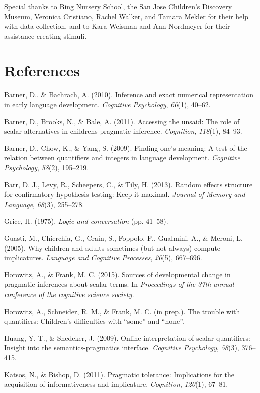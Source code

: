 \documentclass[10pt, letterpaper]{article}
\begin{document}
Special thanks to Bing Nursery School, the San Jose Children's Discovery
Museum, Veronica Cristiano, Rachel Walker, and Tamara Mekler for their
help with data collection, and to Kara Weisman and Ann Nordmeyer for
their assistance creating stimuli.

\section{References}\label{references}

\setlength{\parindent}{-0.1in} \setlength{\leftskip}{0.125in} \noindent

Barner, D., \& Bachrach, A. (2010). Inference and exact numerical
representation in early language development. \emph{Cognitive
Psychology}, \emph{60}(1), 40--62.

Barner, D., Brooks, N., \& Bale, A. (2011). Accessing the unsaid: The
role of scalar alternatives in childrens pragmatic inference.
\emph{Cognition}, \emph{118}(1), 84--93.

Barner, D., Chow, K., \& Yang, S. (2009). Finding one's meaning: A test
of the relation between quantifiers and integers in language
development. \emph{Cognitive Psychology}, \emph{58}(2), 195--219.

Barr, D. J., Levy, R., Scheepers, C., \& Tily, H. (2013). Random effects
structure for confirmatory hypothesis testing: Keep it maximal.
\emph{Journal of Memory and Language}, \emph{68}(3), 255--278.

Grice, H. (1975). \emph{Logic and conversation} (pp. 41--58).

Guasti, M., Chierchia, G., Crain, S., Foppolo, F., Gualmini, A., \&
Meroni, L. (2005). Why children and adults sometimes (but not always)
compute implicatures. \emph{Language and Cognitive Processes},
\emph{20}(5), 667--696.

Horowitz, A., \& Frank, M. C. (2015). Sources of developmental change in
pragmatic inferences about scalar terms. In \emph{Proceedings of the
37th annual conference of the cognitive science society.}

Horowitz, A., Schneider, R. M., \& Frank, M. C. (in prep.). The trouble
with quantifiers: Children's difficulties with ``some'' and ``none''.

Huang, Y. T., \& Snedeker, J. (2009). Online interpretation of scalar
quantifiers: Insight into the semantics-pragmatics interface.
\emph{Cognitive Psychology}, \emph{58}(3), 376--415.

Katsos, N., \& Bishop, D. (2011). Pragmatic tolerance: Implications for
the acquisition of informativeness and implicature. \emph{Cognition},
\emph{120}(1), 67--81.
\end{document}
